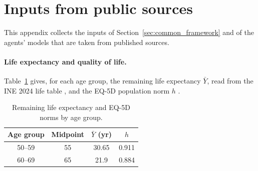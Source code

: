 \documentclass[12pt]{article}
\begin{document}
\section{Inputs from public sources}\label{appendix:prob}

This appendix collects the inputs of Section~\ref{sec:common_framework} and of the agents' models that are taken from published sources.

\paragraph{Life expectancy and quality of life.} Table~\ref{tab:age_stratified} gives, for each age group, the remaining life expectancy $\bar Y$, read from the INE 2024 life table \citep{ine2024mortalidad}, and the EQ-5D population norm $h$ \citep{garcia2016normative}.

\begin{table}[htbp]
\centering
\footnotesize
\caption{Remaining life expectancy and EQ-5D norms by age group.}
\label{tab:age_stratified}
\renewcommand{\arraystretch}{1.2}
\begin{tabular}{c c c c}
\toprule
\textbf{Age group} & \textbf{Midpoint} & \textbf{$\bar Y$ (yr)} & \textbf{$h$} \\
\midrule
50--59 & 55 & 30.65 & 0.911 \\
60--69 & 65 & 21.9  & 0.884 \\
\bottomrule
\end{tabular}
\end{table}
\end{document}
